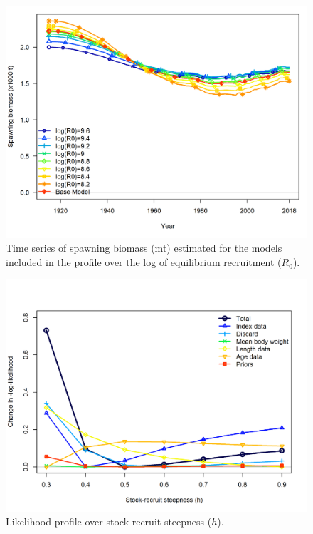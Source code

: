 \documentclass[12pt,]{article}
\begin{document}
\begin{figure}
\centering
\includegraphics{Figures/profile_R0_compare1_spawnbio.png}
\caption{Time series of spawning biomass (mt) estimated for the models
included in the profile over the log of equilibrium recruitment
(\(R_0\)).\label{fig:profile_R0_compare1_spawnbio}}
\end{figure}

\FloatBarrier

\begin{figure}
\centering
\includegraphics{Figures/profile_h.png}
\caption{Likelihood profile over stock-recruit steepness (\(h\)).
\label{fig:profile_h}}
\end{figure}
\end{document}
